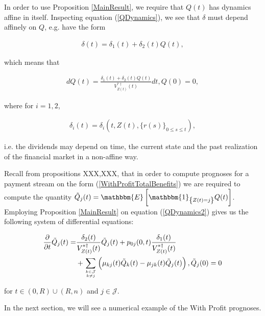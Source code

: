 \documentclass{book}
\newcommand{\1}[1]{\mathbbm{1}_{\left\lbrace #1 \right\rbrace}}
\newcommand{\expec}[1][def]{\mathbbm{E} \left[ #1 \right]}
\theoremstyle{break}
\theoremstyle{remark}
\numberwithin{equation}{section}
\begin{document}
\newpage


 

In order to use Proposition \ref{MainResult}, we require that $Q(t)$ has dynamics affine in itself. Inspecting equation (\ref{QDynamics}), we see that $\delta$ must depend affinely on $Q$, e.g. have the form

\begin{align} \label{DividendAffineInQ}
    \delta(t) = \delta_1(t) + \delta_2(t) Q(t),
\end{align}

which means that

\begin{align} \label{QDynamics2}
    dQ(t) = \frac{\delta_1(t) + \delta_2(t) Q(t)}{V_{Z(t)}^{*\dagger}(t)} dt, Q(0)=0,
\end{align}

where for $i=1,2$,

\begin{align} \label{DeltaDef}
    \delta_i(t) = \delta_i(t, Z(t), \{ r(s) \}_{0 \leq s \leq t}),
\end{align}

i.e. the dividends may depend on time, the current state and the past realization of the financial market in a non-affine way.

Recall from propositions XXX,XXX, that in order to compute prognoses for a payment stream on the form (\ref{WithProfitTotalBenefits}) we are required to compute the quantity $\tilde{Q}_j(t) = \expec[\1{Z(t)=j} Q(t)]$. Employing Proposition \ref{MainResult} on equation (\ref{QDynamics2}) gives us the following system of differential equations:

\begin{align*}
    \frac{\partial}{\partial t} \tilde{Q}_j(t) =& \frac{\delta_2(t)}{V_{Z(t)}^{*\dagger}(t)} \tilde{Q}_j(t) + p_{0j}(0,t) \frac{\delta_1(t)}{V_{Z(t)}^{*\dagger}(t)} \\
    &+ \sum_{k \in \mathcal{J} \atop k \neq j} \left( \mu_{kj}(t) \tilde{Q}_k(t) - \mu_{jk}(t) \tilde{Q}_j(t) \right), \tilde{Q}_j(0)=0
\end{align*}

for $t \in (0,R)\cup(R,n)$ and $j \in \mathcal{J}$.

In the next section, we will see a numerical example of the With Profit prognoses.
\end{document}
